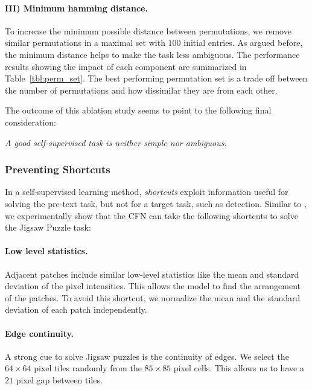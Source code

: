 \documentclass[runningheads]{llncs}
\begin{document}
\paragraph{III) Minimum hamming distance.} To increase the minimum possible distance between permutations, we remove similar permutations in a maximal set with $100$ initial entries. As argued before, the minimum distance helps to make the task less ambiguous. The performance results showing the impact of each component are summarized in Table~\ref{tbl:perm_set}. The best performing permutation set is a trade off between the number of permutations and how dissimilar they are from each other. 

 \vspace{.5em}
The outcome of this ablation study seems to point to the following final consideration:
 \vspace{-.5em}
 \begin{center}
  \textit{A good self-supervised task is neither simple nor ambiguous.} 
 \end{center}
 
\subsubsection{Preventing Shortcuts} \label{subsec:shortcuts} In a self-supervised learning method, \textit{shortcuts} exploit information useful for solving the pre-text task, but not for a target task, such as detection. %
Similar to \cite{Carl2015}, we experimentally show that the CFN can take the following shortcuts to solve the Jigsaw Puzzle task: 

\paragraph{Low level statistics.} Adjacent patches include similar low-level statistics like the mean and standard deviation of the pixel intensities. This allows the model to find the arrangement of the patches. To avoid this shortcut, we normalize the mean and the standard deviation of each patch independently.
\paragraph{Edge continuity.} A strong cue to solve Jigsaw puzzles is the continuity of edges. We select the $64\times 64$ pixel tiles randomly from the $85 \times 85$ pixel cells. This allows us to have a $21$ pixel gap between tiles.
\end{document}
